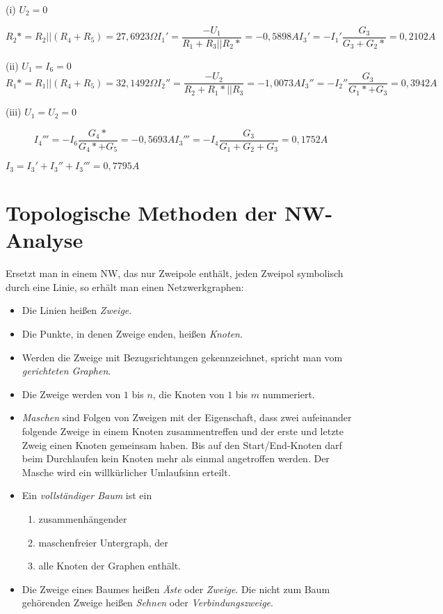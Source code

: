 \documentclass[german]{article}
\newcommand{\ohm}{\Omega}
\begin{document}
(i) $U_2 = 0$

\[
	R_2* = R_2 || (R_4 + R_5) = 27,6923\ohm
	I_1' = \frac{-U_1}{R_1 + R_3 || R_2*} = -0,5898 A
	I_3' = -I_1' \frac{G_3}{G_3 + G_2*} = 0,2102 A
\]

(ii) $U_1 = I_6 = 0$
\[
	R_1* = R_1 || (R_4 + R_5) = 32,1492\ohm
	I_2'' = \frac{-U_2}{R_2 + R_1* || R_3} = -1,0073 A
	I_3'' = -I_2'' \frac{G_3}{G_1* + G_3} = 0,3942 A
\]

(iii) $U_1 = U_2 = 0$

\[
	I_4''' = -I_6 \frac{G_4*}{G_4* + G_5} = - 0,5693 A
	I_3''' = -I_4 \frac{G_3}{G_1 + G_2 + G_3} = 0,1752 A
\]

$I_3 = I_3' + I_3'' + I_3''' = 0,7795 A$

\section{Topologische Methoden der NW-Analyse}

Ersetzt man in einem NW, das nur Zweipole enthält, jeden Zweipol symbolisch durch eine Linie, so erhält man einen Netzwerkgraphen:
\begin{itemize}
	\item Die Linien heißen {\it Zweige}.
	\item Die Punkte, in denen Zweige enden, heißen {\it Knoten}.
	\item Werden die Zweige mit Bezugsrichtungen gekennzeichnet, spricht man vom {\it gerichteten Graphen}.
	\item Die Zweige werden von $1$ bis $n$, die Knoten von $1$ bis $m$ nummeriert.
	\item {\it Maschen} sind Folgen von Zweigen mit der Eigenschaft, dass zwei aufeinander folgende Zweige in einem Knoten zusammentreffen und der erste und letzte Zweig einen Knoten gemeinsam haben. Bis auf den Start/End-Knoten darf beim Durchlaufen kein Knoten mehr als einmal angetroffen werden.
		Der Masche wird ein willkürlicher Umlaufsinn erteilt.
	\item Ein {\it vollständiger Baum} ist ein
		\begin{enumerate}
			\item zusammenhängender
			\item maschenfreier Untergraph, der
			\item alle Knoten der Graphen enthält.
		\end{enumerate}
	\item Die Zweige eines Baumes heißen {\it Äste} oder {\it Zweige}. Die nicht zum Baum gehörenden Zweige heißen {\it Sehnen} oder {\it Verbindungszweige}.
\end{itemize}
\end{document}
